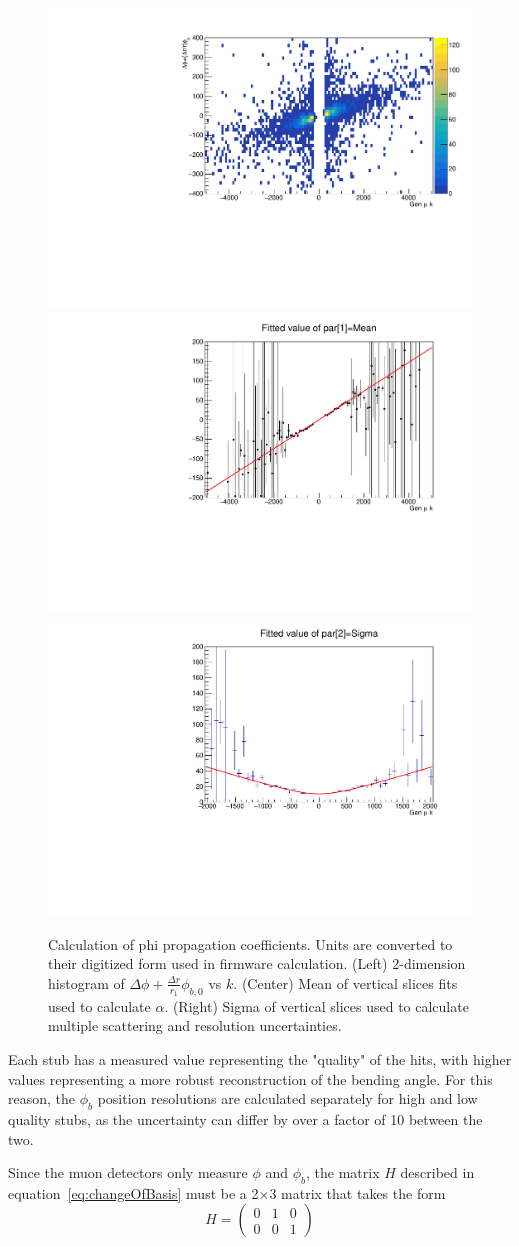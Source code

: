 \begin{figure}[htb!]
	\centering
	\includegraphics[width=0.32\linewidth]{figs/04_muons/phiprop_2d.pdf}
	\includegraphics[width=0.32\linewidth]{figs/04_muons/phiprop_mean.pdf}
	\includegraphics[width=0.32\linewidth]{figs/04_muons/phiprop_sigma.pdf}
	\caption[Calculation of phi propagation coefficients. Units are converted to their digitized form used in firmware calculation. (Left) 2-dimension histogram of $\Delta\phi+\frac{\Delta r}{r_1}\phi_{b,0}$ vs $k$. (Center) Mean of vertical slices fits used to calculate $\alpha$. (Right) Sigma of vertical slices used to calculate multiple scattering and resolution uncertainties.]
	{Calculation of phi propagation coefficients. Units are converted to their digitized form used in firmware calculation. (Left) 2-dimension histogram of $\Delta\phi+\frac{\Delta r}{r_1}\phi_{b,0}$ vs $k$. (Center) Mean of vertical slices fits used to calculate $\alpha$. (Right) Sigma of vertical slices used to calculate multiple scattering and resolution uncertainties.}
	\label{fig:phi_prop}
\end{figure}

Each stub has a measured value representing the "quality" of the hits, with higher values representing a more robust reconstruction of the bending angle. For this reason, the $\phi_b$ position resolutions are calculated separately for high and low quality stubs, as the uncertainty can differ by over a factor of 10 between the two. 

Since the muon detectors only measure $\phi$ and $\phi_b$, the matrix $H$ described in equation~\ref{eq:changeOfBasis} must be a 2$\times$3 matrix that takes the form
\begin{equation}
	H=\left(\begin{matrix}
		0 & 1 & 0\\
		0 & 0 & 1\end{matrix}\right)
\end{equation}


